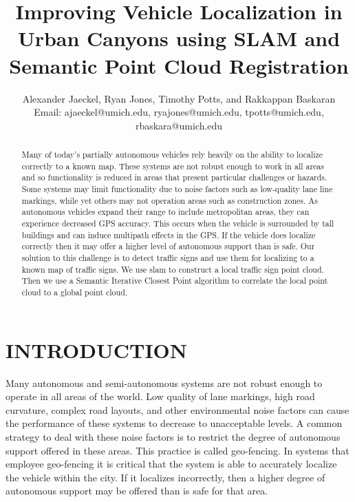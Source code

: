 \documentclass[letterpaper, 10 pt, conference]{ieeeconf}  %
\title{\LARGE \bf
Improving Vehicle Localization in Urban Canyons using SLAM and Semantic Point Cloud Registration
}
\author{Alexander Jaeckel, Ryan Jones, Timothy Potts, and Rakkappan Baskaran\\%
Email: ajaeckel@umich.edu, ryajones@umich.edu, tpotts@umich.edu, rbaskara@umich.edu
}
\begin{document}
\maketitle
\thispagestyle{empty}
\pagestyle{empty}


\begin{abstract}

Many of today’s partially autonomous vehicles rely heavily on the ability to localize correctly to a known map.  These systems are not robust enough to work in all areas and so functionality is reduced in areas that present particular challenges or hazards.  Some systems may limit functionality due to noise factors such as low-quality lane line markings, while yet others may not operation areas such as construction zones. As autonomous vehicles expand their range to include metropolitan areas, they can experience decreased GPS accuracy.  This occurs when the vehicle is surrounded by tall buildings and can induce multipath effects in the GPS.  If the vehicle does localize correctly then it may offer a higher level of autonomous support than is safe.  Our solution to this challenge is to detect traffic signs and use them for localizing to a known map of traffic signs.  We use slam to construct a local traffic sign point cloud.  Then we use a Semantic Iterative Closest Point algorithm to correlate the local point cloud to a global point cloud.

\end{abstract}


\section{INTRODUCTION}

Many autonomous and semi-autonomous systems are not robust enough to operate in all areas of the world. Low quality of lane markings, high road curvature, complex road layouts, and other environmental noise factors can cause the performance of these systems to decrease to unacceptable levels. A common strategy to deal with these noise factors is to restrict the degree of autonomous support offered in these areas. This practice is called geo-fencing. In systems that employee geo-fencing it is critical that the system is able to accurately localize the vehicle within the city. If it localizes incorrectly, then a higher degree of autonomous support may be offered than is safe for that area. 
\end{document}

